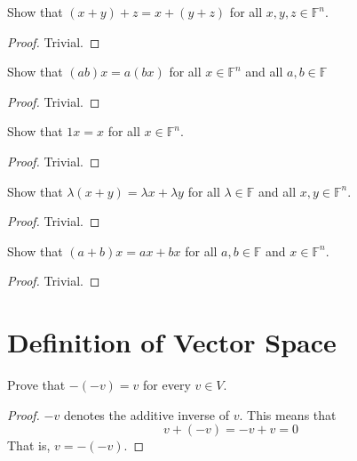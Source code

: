 \begin{exercise} \label{1.A.12}
    Show that \( (x+y)+z = x+(y+z)\) for all \( x,y,z \in \mathbb{F}^n \).
    
    \begin{proof}
        Trivial.
    \end{proof}
\end{exercise}

\begin{exercise} \label{1.A.13}
    Show that \( (ab)x=a(bx) \) for all \( x \in \mathbb{F}^n \) and all \( a,b \in \mathbb{F} \)
    
    \begin{proof}
        Trivial.
    \end{proof}    
\end{exercise}

\begin{exercise} \label{1.A.14}
    Show that \( 1x=x \) for all \( x \in \mathbb{F}^n \).
    
    \begin{proof}
        Trivial.
    \end{proof}
\end{exercise}

\begin{exercise} \label{1.A.15}
    Show that \( \lambda(x+y)=\lambda x + \lambda y \) for all \( \lambda \in \mathbb{F} \) and all \( x,y \in \mathbb{F}^n \).
    
    \begin{proof}
        Trivial.
    \end{proof}
\end{exercise}

\begin{exercise} \label{1.A.16}
    Show that \( (a+b)x=ax+bx \) for all \( a,b \in \mathbb{F} \) and \( x \in \mathbb{F}^n \).
    
    \begin{proof}
        Trivial.
    \end{proof}
\end{exercise}

\section{\label{1.B} Definition of Vector Space}

\begin{exercise} \label{1.B.1}
    Prove that \( -(-v) = v \) for every \( v \in V \).
    
    \begin{proof}
        \( -v \) denotes the additive inverse of \( v \). This means that
        \[
        v+(-v)=-v+v=0 
        \]
        That is, \( v = -(-v) \).
    \end{proof}
\end{exercise}

